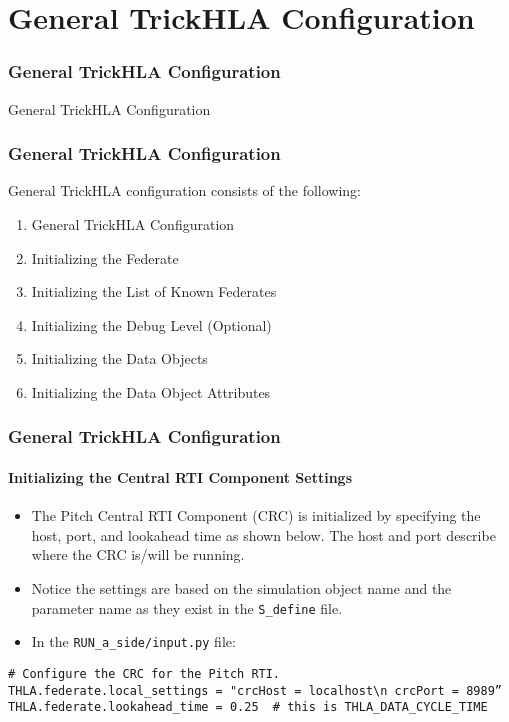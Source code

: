    \section{General TrickHLA Configuration}

   \begin{frame}
      \frametitle{General TrickHLA Configuration}
      \begin{center}
      \Huge{General TrickHLA Configuration}
      \end{center}
   \end{frame}
   
   \begin{frame}
      \frametitle{General TrickHLA Configuration}
      General TrickHLA configuration consists of the following:
      \begin{enumerate}
         \item General TrickHLA Configuration
         \item Initializing the Federate
         \item Initializing the List of Known Federates
         \item Initializing the Debug Level (Optional)
         \item Initializing the Data Objects
         \item Initializing the Data Object Attributes
      \end{enumerate}
   \end{frame}
   
   \begin{frame}[fragile]
      \frametitle{General TrickHLA Configuration}
      \framesubtitle{Initializing the Central RTI Component Settings}
      \begin{itemize}
         \item The Pitch Central RTI Component (CRC) is initialized by specifying
         the host, port, and lookahead time as shown below. The host and port
         describe where the CRC is/will be running.
         \item Notice the settings are based on the simulation object name and
         the parameter name as they exist in the \texttt{S\_define} file.
         \item In the \texttt{RUN\_a\_side/input.py} file:
      \end{itemize}
\begin{Verbatim}[frame=single, fontsize=\footnotesize]
# Configure the CRC for the Pitch RTI.
THLA.federate.local_settings = "crcHost = localhost\n crcPort = 8989”
THLA.federate.lookahead_time = 0.25  # this is THLA_DATA_CYCLE_TIME
\end{Verbatim}
   \end{frame}
   
